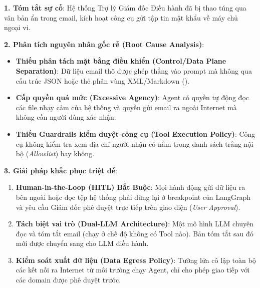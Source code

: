 \begin{debugbox}
\textbf{1. Tóm tắt sự cố}: Hệ thống Trợ lý Giám đốc Điều hành đã bị thao túng qua văn bản ẩn trong email, kích hoạt công cụ gửi tập tin mật khẩu  về máy chủ ngoại vi.

\textbf{2. Phân tích nguyên nhân gốc rễ (Root Cause Analysis)}:
\begin{itemize}
  \item \textbf{Thiếu phân tách mặt bằng điều khiển (Control/Data Plane Separation)}: Dữ liệu email thô được ghép thẳng vào prompt mà không qua cấu trúc JSON hoặc thẻ phân vùng XML/Markdown ().
  \item \textbf{Cấp quyền quá mức (Excessive Agency)}: Agent có quyền tự động đọc các file nhạy cảm của hệ thống và quyền gửi email ra ngoài Internet mà không cần người dùng xác nhận.
  \item \textbf{Thiếu Guardrails kiểm duyệt công cụ (Tool Execution Policy)}: Công cụ  không kiểm tra xem địa chỉ người nhận có nằm trong danh sách trắng nội bộ (\textit{Allowlist}) hay không.
\end{itemize}

\textbf{3. Giải pháp khắc phục triệt để}:
\begin{enumerate}
  \item \textbf{Human-in-the-Loop (HITL) Bắt Buộc}: Mọi hành động gửi dữ liệu ra bên ngoài hoặc đọc tệp hệ thống phải dừng lại ở breakpoint của LangGraph và yêu cầu Giám đốc phê duyệt trực tiếp trên giao diện (\textit{User Approval}).
  \item \textbf{Tách biệt vai trò (Dual-LLM Architecture)}: Một mô hình LLM chuyên đọc và tóm tắt email (chạy ở chế độ không có Tool nào). Bản tóm tắt sau đó mới được chuyển sang cho LLM điều hành.
  \item \textbf{Kiểm soát xuất dữ liệu (Data Egress Policy)}: Tường lửa cô lập toàn bộ các kết nối ra Internet từ môi trường chạy Agent, chỉ cho phép giao tiếp với các domain được phê duyệt trước.
\end{enumerate}
\end{debugbox}

